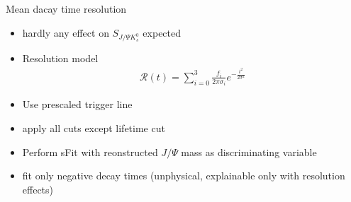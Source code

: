 \documentclass{beamer}
\newcommand{\SJPsi}{S_{J/\Psi K_s^0}}
\begin{document}
	\begin{frame}{Mean dacay time resolution}
	\begin{itemize}
    \item hardly any effect on $\SJPsi$ expected
	\item Resolution model
	\begin{align}
	\mathcal{R}(t) = \sum_{i=0}^3 \frac{f_i}{2\pi\sigma_i}e^{-\tfrac{t^2}{2\sigma^2}}
	\end{align}
	\item Use prescaled trigger line
	\item apply all cuts except lifetime cut
	\item Perform sFit with reonstructed $J/\Psi$ mass as discriminating variable
	\item fit only negative decay times (unphysical, explainable only with resolution effects)
	\end{itemize}
	\end{frame}
	
\end{document}
